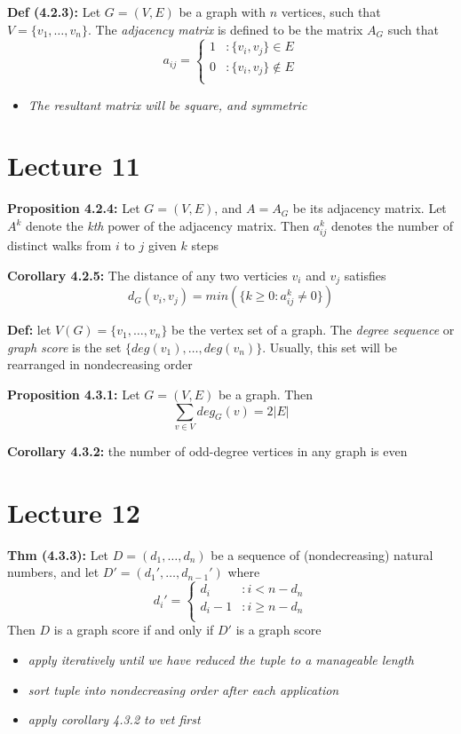 \documentclass[12pt]{article}
\begin{document}
\textbf{Def (4.2.3): }Let $G = (V, E)$ be a graph with $n$ vertices, such that $V = \{ v_1, \dots, v_n \}$. The \emph{adjacency matrix} is defined to be the matrix $A_{G}$ such that 
$$a_{ij} =\left\{
    \begin{array}{lr}
    1 & : \{ v_i, v_j \} \in E\\
    0 & : \{ v_i, v_j\} \notin E\\
    \end{array}
\right. $$
\begin{itemize}
    \item \emph{The resultant matrix will be square, and symmetric}
\end{itemize}

\clearpage

\section{Lecture 11}
\textbf{Proposition 4.2.4: }Let $G = (V, E)$, and $A = A_G$ be its adjacency matrix. Let $A^k$ denote the \emph{kth} power of the adjacency matrix. Then $a_{ij}^k$ denotes the number of distinct walks from $i$ to $j$ given $k$ steps

\textbf{Corollary 4.2.5: }The distance of any two verticies $v_i$ and $v_j$ satisfies 
$$d_G(v_i, v_j) = min(\{ k \geq 0 : a_{ij}^k \neq 0 \})$$

\textbf{Def: }let $V(G) = \{ v_1, \dots, v_n \}$ be the vertex set of a graph. The \emph{degree sequence} or \emph{graph score} is the set $\{ deg(v_1), \dots, deg(v_n)\}$. Usually, this set will be rearranged in nondecreasing order

\textbf{Proposition 4.3.1: }Let $G = (V, E)$ be a graph. Then
$$\sum_{v \in V}deg_G(v) = 2|E|$$

\textbf{Corollary 4.3.2: }the number of odd-degree vertices in any graph is even
\clearpage

\section{Lecture 12}
\textbf{Thm (4.3.3): }Let $D = (d_1, \dots, d_n)$ be a sequence of (nondecreasing) natural numbers, and let $D' = (d_1', \dots, d_{n - 1}')$ where
$$d_i' =\left\{
    \begin{array}{lr}
    d_i & : i < n - d_n\\
    d_i - 1 & : i \geq n - d_n\\
    \end{array}
\right. $$
Then $D$ is a graph score if and only if $D'$ is a graph score
\begin{itemize}
    \item \emph{apply iteratively until we have reduced the tuple to a manageable length}
    \item \emph{sort tuple into nondecreasing order after each application}
    \item \emph{apply corollary 4.3.2 to vet first}
\end{itemize}
\end{document}
